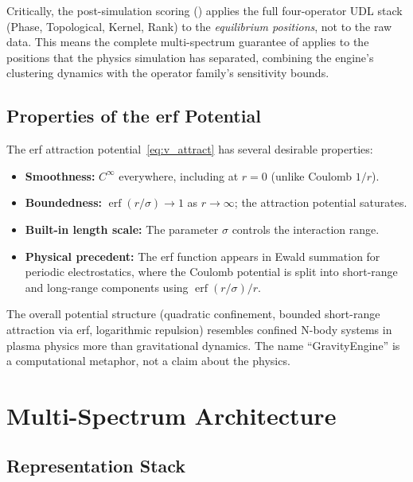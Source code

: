 \documentclass{article}
\DeclareMathOperator{\erf}{erf}
\begin{document}
Critically, the post-simulation scoring () applies the full four-operator UDL stack (Phase, Topological, Kernel, Rank) to the \emph{equilibrium positions}, not to the raw data. This means the complete multi-spectrum guarantee of  applies to the positions that the physics simulation has separated, combining the engine's clustering dynamics with the operator family's sensitivity bounds.

\subsection{Properties of the erf Potential}

The erf attraction potential~\eqref{eq:v_attract} has several desirable properties:
\begin{itemize}[leftmargin=*]
    \item \textbf{Smoothness:} $C^\infty$ everywhere, including at $r=0$ (unlike Coulomb $1/r$).
    \item \textbf{Boundedness:} $\erf(r/\sigma) \to 1$ as $r \to \infty$; the attraction potential saturates.
    \item \textbf{Built-in length scale:} The parameter $\sigma$ controls the interaction range.
    \item \textbf{Physical precedent:} The erf function appears in Ewald summation for periodic electrostatics, where the Coulomb potential is split into short-range and long-range components using $\erf(r/\sigma)/r$.
\end{itemize}

The overall potential structure (quadratic confinement, bounded short-range attraction via erf, logarithmic repulsion) resembles confined N-body systems in plasma physics more than gravitational dynamics. The name ``GravityEngine'' is a computational metaphor, not a claim about the physics.

\section{Multi-Spectrum Architecture}
\label{sec:framework}

\subsection{Representation Stack}
\end{document}
